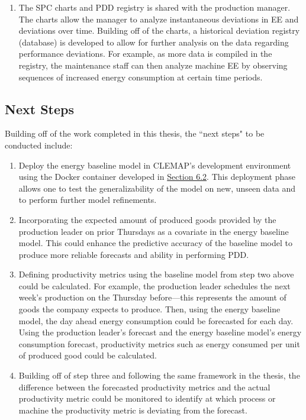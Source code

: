 \begin{enumerate}
    \item The SPC charts and PDD registry is shared with the production manager. The charts allow the manager to analyze instantaneous deviations in EE and deviations over time. Building off of the charts, a historical deviation registry (database) is developed to allow for further analysis on the data regarding performance deviations. For example, as more data is compiled in the registry, the maintenance staff can then analyze machine EE by observing sequences of increased energy consumption at certain time periods.
    
\end{enumerate}

\subsection{Next Steps}

Building off of the work completed in this thesis, the ``next steps" to be conducted include:

\begin{enumerate}

    \item Deploy the energy baseline model in CLEMAP's development environment using the Docker container developed in \hyperlink{subsection.6.2}{Section 6.2}. This deployment phase allows one to test the generalizability of the model on new, unseen data and to perform further model refinements. 

    \item Incorporating the expected amount of produced goods provided by the production leader on prior Thursdays as a covariate in the energy baseline model. This could enhance the predictive accuracy of the baseline model to produce more reliable forecasts and ability in performing PDD.
    
    \item Defining productivity metrics using the baseline model from step two above could be calculated. For example, the production leader schedules the next week's production on the Thursday before—this represents the amount of goods the company expects to produce. Then, using the energy baseline model, the day ahead energy consumption could be forecasted for each day. Using the production leader's forecast and the energy baseline model's energy consumption forecast, productivity metrics such as energy consumed per unit of produced good could be calculated.
    
    \item Building off of step three and following the same framework in the thesis, the difference between the forecasted productivity metrics and the actual productivity metric could be monitored to identify at which process or machine the productivity metric is deviating from the forecast.
\end{enumerate}